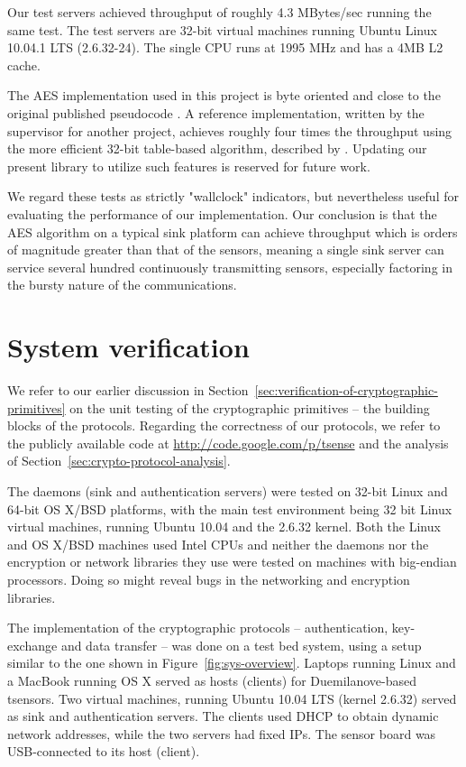 Our test servers achieved throughput of roughly 4.3 MBytes/sec running the same test. The test servers are 32-bit virtual machines running Ubuntu Linux 10.04.1 LTS (2.6.32-24). The single CPU runs at 1995 MHz and has a 4MB L2 cache.

The AES implementation used in this project is byte oriented and close to the original published pseudocode . A reference implementation, written by the supervisor for another project, achieves roughly four times the throughput using the more efficient 32-bit table-based algorithm, described by . Updating our present library to utilize such features is reserved for future work.

We regard these tests as strictly "wallclock" indicators, but nevertheless useful for evaluating the performance of our implementation.
%
Our conclusion is that the AES algorithm on a typical sink platform can achieve throughput which is orders of magnitude greater than that of the sensors, meaning a single sink server can service several hundred continuously transmitting sensors, especially factoring in the bursty nature of the communications.

\section{System verification}

We refer to our earlier discussion in Section~\ref{sec:verification-of-cryptographic-primitives} on the unit testing of the cryptographic primitives -- the building blocks of the protocols. Regarding the correctness of our protocols, we refer to the publicly available code at \url{http://code.google.com/p/tsense} and the analysis of Section~\ref{sec:crypto-protocol-analysis}.

The daemons (sink and authentication servers) were tested on 32-bit Linux and 64-bit OS X/BSD platforms, with the main test environment being 32 bit Linux virtual machines, running Ubuntu 10.04 and the 2.6.32 kernel. Both the Linux and OS X/BSD machines used Intel CPUs and neither the daemons nor the encryption or network libraries they use were tested on machines with big-endian processors. Doing so might reveal bugs in the networking and encryption libraries. 

The implementation of the cryptographic protocols -- authentication, key-exchange and data transfer -- was done on a test bed system, using a setup similar to the one shown in Figure~\ref{fig:sys-overview}. Laptops running Linux and a MacBook running OS X served as hosts (clients) for Duemilanove-based tsensors. Two virtual machines, running Ubuntu 10.04 LTS (kernel 2.6.32) served as sink and authentication servers. The clients used DHCP to obtain dynamic network addresses, while the two servers had fixed IPs. The sensor board was USB-connected to its host (client).

